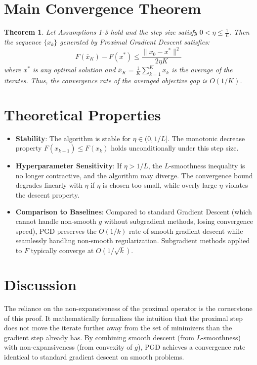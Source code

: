 \documentclass{article}
\newtheorem{theorem}{Theorem}
\begin{document}
\section*{Main Convergence Theorem}
\begin{theorem}
Let Assumptions 1-3 hold and the step size satisfy $0 < \eta \leq \frac{1}{L}$. Then the sequence $\{x_k\}$ generated by Proximal Gradient Descent satisfies:
\begin{equation}
F(\bar{x}_K) - F(x^*) \leq \frac{\|x_0 - x^*\|^2}{2 \eta K}
\end{equation}
where $x^*$ is any optimal solution and $\bar{x}_K = \frac{1}{K}\sum_{k=1}^K x_k$ is the average of the iterates. Thus, the convergence rate of the averaged objective gap is $O(1/K)$.
\end{theorem}

\section*{Theoretical Properties}
\begin{itemize}
\item \textbf{Stability}: The algorithm is stable for $\eta \in (0, 1/L]$. The monotonic decrease property $F(x_{k+1}) \leq F(x_k)$ holds unconditionally under this step size.
\item \textbf{Hyperparameter Sensitivity}: If $\eta > 1/L$, the $L$-smoothness inequality is no longer contractive, and the algorithm may diverge. The convergence bound degrades linearly with $\eta$ if $\eta$ is chosen too small, while overly large $\eta$ violates the descent property.
\item \textbf{Comparison to Baselines}: Compared to standard Gradient Descent (which cannot handle non-smooth $g$ without subgradient methods, losing convergence speed), PGD preserves the $O(1/k)$ rate of smooth gradient descent while seamlessly handling non-smooth regularization. Subgradient methods applied to $F$ typically converge at $O(1/\sqrt{k})$.
\end{itemize}

\section*{Discussion}
The reliance on the non-expansiveness of the proximal operator is the cornerstone of this proof. It mathematically formalizes the intuition that the proximal step does not move the iterate further away from the set of minimizers than the gradient step already has. By combining smooth descent (from $L$-smoothness) with non-expansiveness (from convexity of $g$), PGD achieves a convergence rate identical to standard gradient descent on smooth problems.
\end{document}
